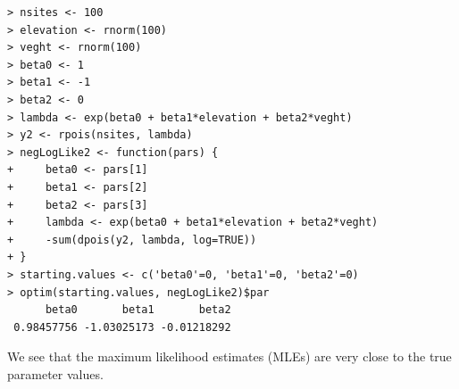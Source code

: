 \begin{verbatim}
> nsites <- 100
> elevation <- rnorm(100)
> veght <- rnorm(100)
> beta0 <- 1
> beta1 <- -1
> beta2 <- 0
> lambda <- exp(beta0 + beta1*elevation + beta2*veght)
> y2 <- rpois(nsites, lambda)
> negLogLike2 <- function(pars) {
+     beta0 <- pars[1]
+     beta1 <- pars[2]
+     beta2 <- pars[3]
+     lambda <- exp(beta0 + beta1*elevation + beta2*veght)
+     -sum(dpois(y2, lambda, log=TRUE))
+ }
> starting.values <- c('beta0'=0, 'beta1'=0, 'beta2'=0)
> optim(starting.values, negLogLike2)$par
      beta0       beta1       beta2
 0.98457756 -1.03025173 -0.01218292
\end{verbatim}
We see that the maximum likelihood estimates (MLEs) are very close to
the true parameter values.

